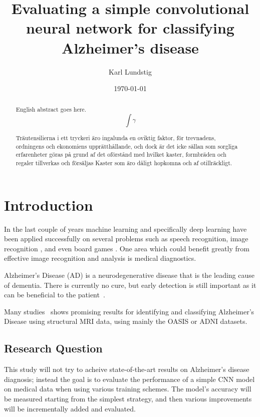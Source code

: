 \documentclass{kththesis}
\title{Evaluating a simple convolutional neural network for classifying Alzheimer's disease} \alttitle{Utvärdering av ett enkelt CNN-nätverk för klassifiering av Alzheimers sjukdom}
\author{Karl Lundstig}
\date{\today}
\begin{document}
\frontmatter

\titlepage

\begin{abstract}
  English abstract goes here.
  $$\int \gamma$$

\end{abstract}


\begin{otherlanguage}{swedish}
  \begin{abstract}
    Träutensilierna i ett tryckeri äro ingalunda en oviktig faktor,
    för trevnadens, ordningens och ekonomiens upprätthållande, och
    dock är det icke sällan som sorgliga erfarenheter göras på grund
    af det oförstånd med hvilket kaster, formbräden och regaler
    tillverkas och försäljas Kaster som äro dåligt hopkomna och af
    otillräckligt.
  \end{abstract}
\end{otherlanguage}


\setcounter{secnumdepth}{2}
\setcounter{tocdepth}{2}
\tableofcontents


\mainmatter

\chapter{Introduction}

In the last couple of years machine learning and specifically deep learning have been applied successfully on several problems such as speech recognition, image recognition \parencite{krizhevsky2012imagenet}, and even board games \parencite{silver2018general}. One area which could benefit greatly from effective image recognition and analysis is medical diagnostics.

Alzheimer’s Disease (AD) is a neurodegenerative disease that is the leading cause of dementia. There is currently no cure, but early detection is still important as it can be beneficial to the patient~\cite{factsfigures2018}.

Many studies~\cite{islam2017novel, islam2018early} shows promising results for identifying and classifying Alzheimer’s Disease using structural MRI data, using mainly the OASIS\cite{oasis} or ADNI\cite{adni} datasets.

\section{Research Question}
This study will not try to acheive state-of-the-art results on Alzheimer's disease diagnosis; instead the goal is to evaluate the performance of a simple CNN model on medical data when using various training schemes. The model's accuracy will be measured starting from the simplest strategy, and then various improvements will be incrementally added and evaluated.
\end{document}
